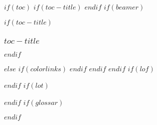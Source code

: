 $if(toc)$
$if(toc-title)$
\renewcommand*\contentsname{$toc-title$}
$endif$
$if(beamer)$
\begin{frame}[allowframebreaks]
$if(toc-title)$
  \frametitle{$toc-title$}
$endif$
  \tableofcontents[hideallsubsections]
\end{frame}
$else$
{
$if(colorlinks)$
\hypersetup{linkcolor=$if(toccolor)$$toccolor$$else$$endif$}
$endif$
\setcounter{tocdepth}{$toc-depth$}
\tableofcontents
}
$endif$
$endif$
\clearpage
$if(lof)$
\listoffigures
$endif$
$if(lot)$
\listoftables
$endif$
\clearpage%
$if(glossar)$

\clearpage
$endif$
\clearpage%
